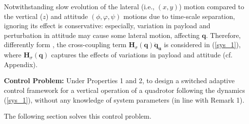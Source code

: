 \begin{remark}
	Notwithstanding slow evolution of the lateral (i.e., $(x,y)$) motion compared to the vertical ($z$) and attitude $( \phi, \varphi, \psi )$ motions due to time-scale separation, ignoring its effect is conservative: especially, variation in payload and perturbation in attitude may cause some lateral motion, affecting $\mathbf{q}$. Therefore, differently form \cite{mofid2018adaptive, nicol2011robust}, the cross-coupling term $\mathbf{H}_\sigma( \mathbf q)\ddot{ \mathbf{q}}_{\mathbf u}$ is considered in (\ref{sys_1}), where $\mathbf{H}_\sigma( \mathbf q)$ captures the effects of variations in payload and attitude (cf. Appendix).
\end{remark}
\textbf{Control Problem:} Under Properties 1 and 2, to design a switched adaptive control framework for a vertical operation of a quadrotor following the dynamics (\ref{sys_1}), without any knowledge of system parameters (in line with Remark 1). %

The following section solves this control problem. 

